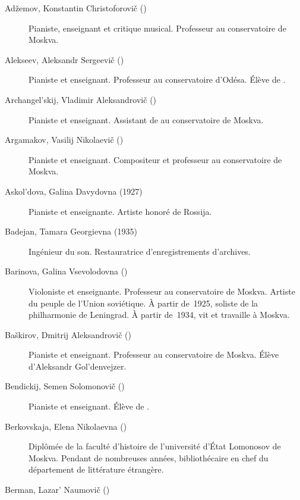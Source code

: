 \begin{description}
 \item[Adžemov, Konstantin Christoforovič ()]%
 Pianiste, enseignant et critique musical.
 Professeur au conservatoire de Moskva.
 \item[Alekseev, Aleksandr Sergeevič ()]%
 Pianiste et enseignant.
 Professeur au conservatoire d'\hbox{Odésa}.
 Élève de \HNeuhaus{}.
 \item[Archangel'skij, Vladimir Aleksandrovič ()]%
 Pianiste et enseignant.
 Assistant de \VSofronitsky{} au conservatoire de Moskva.
 \item[Argamakov, Vasilij Nikolaevič ()]%
 Pianiste et enseignant.
 Compositeur et professeur au conservatoire de Moskva.
 \item[Askol'dova, Galina Davydovna (1927\dvsborn{})]%
 Pianiste et enseignante.
 Artiste honoré de Rossija.
 \item[Badejan, Tamara Georgievna (1935\dvsborn{})]%
 Ingénieur du son.
 Restauratrice d'enregistrements d'archives.
 \item[Barinova, Galina Vsevolodovna ()]%
 Violoniste et enseignante.
 Professeur au conservatoire de Moskva.
 Artiste du peuple de l'\hbox{Union} soviétique.
 À partir de~1925, soliste de la philharmonie de Leningrad.
 À partir de~1934, vit et travaille à Moskva.
 \item[Baškirov, Dmitrij Aleksandrovič ()]%
 Pianiste et enseignant.
 Professeur au conservatoire de Moskva.
 Élève d'\hbox{Aleksandr} Gol'denvejzer.
 \item[Bendickij, Semen Solomonovič ()]%
 Pianiste et enseignant.
 Élève de \HNeuhaus{}.
 \item[Berkovskaja, Elena Nikolaevna ()]%
 Diplômée de la faculté d'histoire de l'université d'\hbox{État} Lomonosov
 de Moskva.
 Pendant de nombreuses années, bibliothécaire en chef du département de
 littérature étrangère.
 \item[Berman, Lazar' Naumovič ()]%

\end{description}
